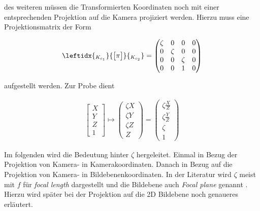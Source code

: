 des weiteren müssen die Transformierten Koordinaten noch mit einer entsprechenden Projektion auf die Kamera projiziert werden. Hierzu muss eine Projektionsmatrix der Form

	\begin{gather}
\leftidx{_{K_{c_1}}}{\begin{bmatrix}
	\pi
	\end{bmatrix}}{_{K_{c_2}}} 
= 
\begin{pmatrix}
\zeta&0&0&0\\
0&\zeta&0&0\\
0&0&\zeta&0\\
0&0&1&0
\end{pmatrix}
\end{gather}

aufgestellt werden. Zur Probe dient 


\begin{gather}
\begin{bmatrix}
X\\Y\\Z\\1
\end{bmatrix} \mapsto
\begin{pmatrix}
\zeta X\\ \zeta Y\\ \zeta Z \\ Z
\end{pmatrix}
=
\begin{pmatrix}
\zeta \frac{X}{Z}\\ \zeta \frac{Y}{Z}\\ \zeta  \\ 1
\end{pmatrix}
\end{gather}


Im folgenden wird die Bedeutung hinter $\zeta$ hergeleitet. Einmal in Bezug der Projektion von Kamera- in Kamerakoordinaten. Danach in Bezug auf die Projektion von Kamera- in Bildebenenkoordinaten. In der Literatur  wird $\zeta$ meist mit $f$ für \textit{focal length} dargestellt und die Bildebene auch \textit{Focal plane} genannt \cite{HZ}. Hierzu wird später bei der Projektion auf die 2D Bildebene noch genaueres erläutert.

